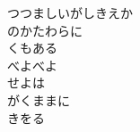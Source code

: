 \documentclass[10pt,b5j]{tarticle} %
\begin{document}
\begin{enumerate}
\begin{minipage}[c]{\blocksize}
        \vspace{\linespace}
        \item
        つつましいがしきえか\\
        のかたわらに\\
        くもある\\
        べよべよ\\
        せよは\\
        がくままに\\
        きをる
    
    \end{minipage}
\end{enumerate} %
\end{document}

